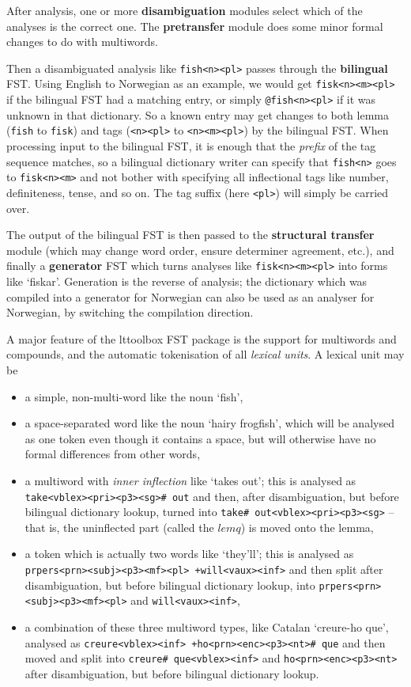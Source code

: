 \documentclass[10pt, a4paper]{article}
\newcommand{\ana}[1]{\texttt{#1}}
\newcommand{\f}[1]{`#1'}
\begin{document}
After analysis, one or more \textbf{disambiguation} modules select
which of the analyses is the correct one. The \textbf{pretransfer}
module does some minor formal changes to do with multiwords.

Then a disambiguated analysis like \ana{fish<n><pl>} passes through
the \textbf{bilingual} FST. Using English to Norwegian as an example,
we would get \ana{fisk<n><m><pl>} if the bilingual FST had a matching
entry, or simply \ana{@fish<n><pl>} if it was unknown in that
dictionary. So a known entry may get changes to both lemma (\ana{fish}
to \ana{fisk}) and tags (\ana{<n><pl>} to \ana{<n><m><pl>}) by the
bilingual FST. When processing input to the bilingual FST, it is
enough that the \emph{prefix} of the tag sequence matches, so a
bilingual dictionary writer can specify that \ana{fish<n>} goes to
\ana{fisk<n><m>} and not bother with specifying all inflectional tags
like number, definiteness, tense, and so on. The tag suffix (here
\ana{<pl>}) will simply be carried over.

The output of the bilingual FST is then passed to the
\textbf{structural transfer} module (which may change word order,
ensure determiner agreement, etc.), and finally a \textbf{generator}
FST which turns analyses like \ana{fisk<n><m><pl>} into forms like
\f{fiskar}. Generation is the reverse of analysis; the dictionary
which was compiled into a generator for Norwegian can also be used as
an analyser for Norwegian, by switching the compilation direction.

A major feature of the lttoolbox FST package is the support
for multiwords and compounds, and the automatic tokenisation of all
\emph{lexical units}. A lexical unit may be
\begin{itemize}
\item a simple, non-multi-word like the noun \f{fish},
\item a space-separated word like the noun \f{hairy frogfish}, which
  will be analysed as one token even though it contains a space, but
  will otherwise have no formal
  differences from other words,
\item a multiword with \emph{inner inflection} like \f{takes out}; this is
  analysed as \ana{take<vblex><pri><p3><sg>\# out} and then, after
  disambiguation, but before bilingual dictionary lookup, turned into
  \ana{take\# out<vblex><pri><p3><sg>} -- that is, the uninflected part
  (called the $lemq$) is moved onto the lemma,
\item a token which is actually two words like \f{they'll}; this is
  analysed as \ana{prpers<prn><subj><p3><mf><pl> +will<vaux><inf>} and
  then split after disambiguation, but before bilingual dictionary
  lookup, into \ana{prpers<prn><subj><p3><mf><pl>} and
  \ana{will<vaux><inf>},
\item a combination of these three multiword types, like Catalan
  \f{creure-ho que}, analysed as \ana{creure<vblex><inf>
    +ho<prn><enc><p3><nt>\# que} and then moved and split into
  \ana{creure\# que<vblex><inf>} and \ana{ho<prn><enc><p3><nt>} after
  disambiguation, but before bilingual dictionary lookup.
\end{itemize}
\end{document}
